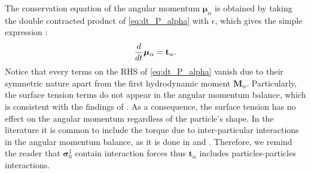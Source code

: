 The conservation equation of the angular momentum $\bm{\mu}_\alpha$ is obtained by taking the double contracted product of \ref{eq:dt_P_alpha} with $\epsilon$, which gives the simple expression :
\begin{equation}
    \frac{d}{d t}\bm{\mu}_\alpha
    =  
    \textbf{t}_\alpha.
    \label{eq:dt_mu_alpha}
\end{equation}
Notice that every terms on the RHS of \ref{eq:dt_P_alpha} vanish due to their symmetric nature apart from the first hydrodynamic moment $\textbf{M}_\alpha$.
Particularly, the surface tension terms do not appear in the angular momentum balance, which is consistent with the findings of \citet{hesla1993note}. 
As a consequence, the surface tension has no effect on the angular momentum regardless of the particle's shape. 
In the literature it is common to include the torque due to inter-particular interactions in the angular momentum balance, as it is done in \citet{jackson1997locally} and \citet{zhang1997momentum}.
Therefore, we remind the reader that $\bm{\sigma}_0^1$ contain interaction forces thus $\textbf{t}_\alpha$ includes particles-particles interactions.


